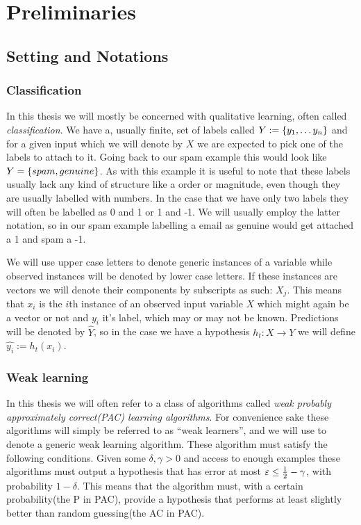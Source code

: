 
\chapter{Preliminaries}
\label{chap:prelim}
\section{Setting and Notations}
\subsection{Classification} 
\label{subsec:class}
\par {} In this thesis we will mostly be concerned with qualitative learning, often called \textit{classification}\cite{Hastie2009}. We have a, usually finite, set of labels called $Y:=\left\{y_1,\ldots y_n\right\}$ and for a given input which we will denote by $X$ we are expected to pick one of the labels to attach to it. Going back to our spam example this would look like $Y=\left\{spam, genuine\right\}$. As with this example it is useful to note that these labels usually lack any kind of structure like a order or magnitude, even though they are usually labelled with numbers. In the case that we have only two labels they will often be labelled as 0 and 1 or 1 and -1. We will usually employ the latter notation, so in our spam example labelling a email as genuine would get attached a 1 and spam a -1. 

\par We will use upper case letters to denote generic instances of a variable while observed instances will be denoted by lower case letters. If these instances are vectors we will denote their components by subscripts as such: $X_j$. This means that $x_i$ is the $i$th instance of an observed input variable $X$ which might again be a vector or not and $y_i$ it's label, which may or may not be known.  Predictions will be denoted by $\hat Y$, so in the case we have a hypothesis $h_t:X\to Y$ we will define $\hat{y_i}:=h_t(x_i)$.  

\subsection{Weak learning}
\label{subsec:weak}
In this thesis we will often refer to a class of algorithms called \textit{weak probably approximately correct(PAC) learning algorithms}\cite{Freund1997}. For convenience sake these algorithms will simply be referred to as ``weak learners'', and we will use \weak to denote a generic weak learning algorithm. These algorithm must satisfy the following conditions. Given some $\delta,\gamma >0$ and access to enough examples these algorithms must output a hypothesis that has error at most $\varepsilon \leq \frac12-\gamma$, with probability $1-\delta$. This means that the algorithm must, with a certain probability(the P in PAC), provide a hypothesis that performs at least slightly better than random guessing(the AC in PAC). 

